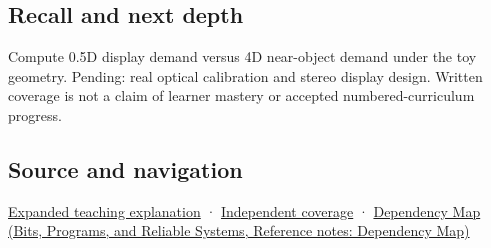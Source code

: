 \subsection{Recall and next depth}\label{appendix-f90cee1be7a4-recall-and-next-depth}

Compute 0.5D display demand versus 4D near-object demand under the toy geometry. Pending: real optical calibration and stereo display design. Written coverage is not a claim of learner mastery or accepted numbered-curriculum progress.

\subsection{Source and navigation}\label{appendix-f90cee1be7a4-source-and-navigation}

\hyperref[04-visual-computing-ii-ch042-focus-and-stereo-can-disagree-even-when-the-images-are-sharp]{Expanded teaching explanation} · \hyperref[appendix-fd090d982a15-xr01---independent-seeing-and-representation-source]{Independent coverage} · \href{../01-Bits-Programs-and-Reliable-Systems/main.pdf\#nameddest=appendix-4ad47bdd269a}{Dependency Map (Bits, Programs, and Reliable Systems, Reference notes: Dependency Map)}
